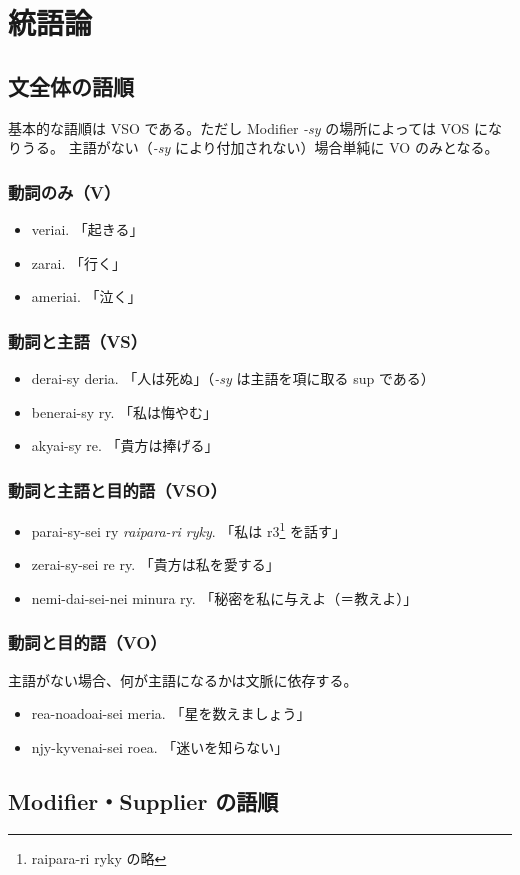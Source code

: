 \section{統語論}

\subsection{文全体の語順}

基本的な語順は VSO である。ただし Modifier \emph{-sy} の場所によっては VOS になりうる。
主語がない（\emph{-sy} により付加されない）場合単純に VO のみとなる。

\subsubsection{動詞のみ（V）}

\begin{itemize}
    \item veriai.   「起きる」
    \item zarai.    「行く」
    \item ameriai.  「泣く」
\end{itemize}

\subsubsection{動詞と主語（VS）}
\begin{itemize}
    \item derai-sy deria.   「人は死ぬ」（\emph{-sy} は主語を項に取る sup である）
    \item benerai-sy ry.    「私は悔やむ」
    \item akyai-sy re.      「貴方は捧げる」
\end{itemize}

\subsubsection{動詞と主語と目的語（VSO）}

\begin{itemize}
    \item parai-sy-sei ry \emph{raipara-ri ryky}. 「私は r3\footnote{raipara-ri ryky の略} を話す」
    \item zerai-sy-sei re ry. 「貴方は私を愛する」
    \item nemi-dai-sei-nei minura ry. 「秘密を私に与えよ（＝教えよ）」
\end{itemize}

\subsubsection{動詞と目的語（VO）}
主語がない場合、何が主語になるかは文脈に依存する。

\begin{itemize}
    \item rea-noadoai-sei meria. 「星を数えましょう」
    \item njy-kyvenai-sei roea. 「迷いを知らない」
\end{itemize}

\subsection{Modifier・Supplier の語順}